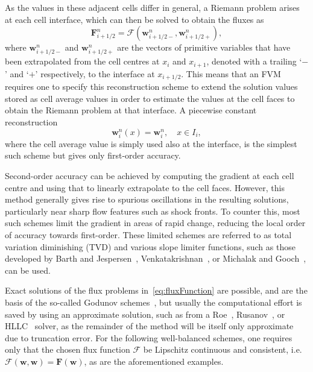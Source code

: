 As the values in these adjacent cells differ in general, a Riemann problem arises at each cell interface, which can then be solved to obtain the fluxes as
\begin{equation} \label{eq:fluxFunction}
\mathbf{F}_{i+1/2}^n=\bm{\mathcal{F}}\left(\mathbf{w}_{i+1/2-}^n,\mathbf{w}_{i+1/2+}^n\right),
\end{equation}
where $\mathbf{w}_{i+1/2-}^n$ and $\mathbf{w}_{i+1/2+}^n$ are the vectors of primitive variables that have been extrapolated from the cell centres at $x_i$ and $x_{i+1}$, denoted with a trailing `$-$' and `$+$' respectively, to the interface at $x_{i+1/2}$. This means that an FVM requires one to specify this reconstruction scheme to extend the solution values stored as cell average values in order to estimate the values at the cell faces to obtain the Riemann problem at that interface. A piecewise constant reconstruction
\begin{equation}
\mathbf{w}_i^n(x)=\mathbf{w}_i^n,\quad x\in I_i,
\end{equation}
where the cell average value is simply used also at the interface, is the simplest such scheme but gives only first-order accuracy.

Second-order accuracy can be achieved by computing the gradient at each cell centre and using that to linearly extrapolate to the cell faces. However, this method generally gives rise to spurious oscillations in the resulting solutions, particularly near sharp flow features such as shock fronts. To counter this, most such schemes limit the gradient in areas of rapid change, reducing the local order of accuracy towards first-order. These limited schemes are referred to as total variation diminishing (TVD) and various slope limiter functions, such as those developed by Barth and Jespersen~\cite{Barth1989}, Venkatakrishnan~\cite{Venkatakrishnan1993,Venkatakrishnan1995}, or Michalak and Gooch~\cite{Michalak2008}, can be used.

Exact solutions of the flux problems in~\eqref{eq:fluxFunction} are possible, and are the basis of the so-called Godunov schemes~\cite{Godunov1959}, but usually the computational effort is saved by using an approximate solution, such as from a Roe~\cite{Roe1981}, Rusanov~\cite{Rusanov1961}, or HLLC~\cite{Toro1994} solver, as the remainder of the method will be itself only approximate due to truncation error. For the following well-balanced schemes, one requires only that the chosen flux function $\bm{\mathcal{F}}$ be Lipschitz continuous and consistent, i.e.~$\bm{\mathcal{F}}(\mathbf{w},\mathbf{w})=\mathbf{F}(\mathbf{w})$, as are the aforementioned examples.

